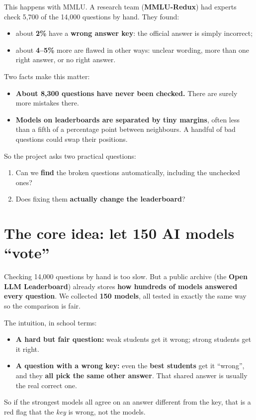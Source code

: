 \documentclass[11pt]{article}
\begin{document}
This happens with MMLU. A research team (\textbf{MMLU-Redux}) had experts check 5,700 of the 14,000
questions by hand. They found:
\begin{itemize}
  \item about \textbf{2\%} have a \textbf{wrong answer key}: the official answer is simply incorrect;
  \item about \textbf{4--5\%} more are flawed in other ways: unclear wording, more than one right
    answer, or no right answer.
\end{itemize}
Two facts make this matter:
\begin{itemize}
  \item \textbf{About 8,300 questions have never been checked.} There are surely more mistakes there.
  \item \textbf{Models on leaderboards are separated by tiny margins}, often less than a fifth of a
    percentage point between neighbours. A handful of bad questions could swap their positions.
\end{itemize}
So the project asks two practical questions:
\begin{enumerate}
  \item Can we \textbf{find} the broken questions automatically, including the unchecked ones?
  \item Does fixing them \textbf{actually change the leaderboard}?
\end{enumerate}

\section{The core idea: let 150 AI models ``vote''}

Checking 14,000 questions by hand is too slow. But a public archive (the \textbf{Open LLM
Leaderboard}) already stores \textbf{how hundreds of models answered every question}. We collected
\textbf{150 models}, all tested in exactly the same way so the comparison is fair.

The intuition, in school terms:
\begin{itemize}
  \item \textbf{A hard but fair question:} weak students get it wrong; strong students get it right.
  \item \textbf{A question with a wrong key:} even the \textbf{best students} get it ``wrong'', and they
    \textbf{all pick the same other answer}. That shared answer is usually the real correct one.
\end{itemize}
So if the strongest models all agree on an answer different from the key, that is a red flag that
the \emph{key} is wrong, not the models.
\end{document}
